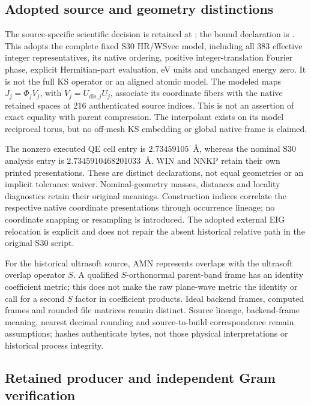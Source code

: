 \subsection{Adopted source and geometry distinctions}

The source-specific scientific decision is retained at
;
the bound declaration is
.
This adopts the complete fixed S30 HR/WSvec model, including all 383 effective
integer representatives, its native ordering, positive integer-translation
Fourier phase, explicit Hermitian-part evaluation, eV units and unchanged
energy zero. It is not the full KS operator or an aligned atomic model.
The modeled maps $J_j=\Phi_jV_j$, with $V_j=U_{\mathrm{dis},j}U_j$, associate
its coordinate fibers with the native retained spaces at 216 authenticated
source indices. This is not an assertion of exact equality with parent
compression. The interpolant exists on its model reciprocal torus, but no
off-mesh KS embedding or global native frame is claimed.

The nonzero executed QE cell entry is $2.73459105$~\AA, whereas the nominal
S30 analysis entry is $2.7345910468201033$~\AA. WIN and NNKP retain their own
printed presentations. These are distinct declarations, not equal geometries
or an implicit tolerance waiver. Nominal-geometry masses, distances and
locality diagnostics retain their original meanings. Construction indices
correlate the respective native coordinate presentations through occurrence
lineage; no coordinate snapping or resampling is introduced. The adopted
external EIG relocation is explicit and does not repair the absent historical
relative path in the original S30 script.

For the historical ultrasoft source, AMN represents overlaps with the
ultrasoft overlap operator $S$. A qualified $S$-orthonormal parent-band frame
has an identity coefficient metric; this does not make the raw plane-wave
metric the identity or call for a second $S$ factor in coefficient products.
Ideal backend frames, computed frames and rounded file matrices remain
distinct. Source lineage, backend-frame meaning, nearest decimal rounding and
source-to-build correspondence remain assumptions; hashes authenticate bytes,
not those physical interpretations or historical process integrity.

\subsection{Retained producer and independent Gram verification}

